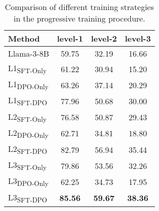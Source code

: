 \begin{table}[t]
    \small
    \centering
    \begin{tabular}{l|ccc}
    \toprule
    \textbf{Method} & \textbf{level-1} & \textbf{level-2} & \textbf{level-3} \\ \midrule
    Llama-3-8B & 59.75 & 32.19 & 16.66 \\ \midrule
    L1\textsubscript{SFT-Only} & 61.22 & 30.94 & 15.20 \\ 
    L1\textsubscript{DPO-Only} & 63.26 & 37.14 & 20.29 \\ 
    L1\textsubscript{SFT-DPO} & 77.96 & 50.68 & 30.00 \\ \midrule
    L2\textsubscript{SFT-Only} & 76.58 & 50.87 & 29.43 \\ 
    L2\textsubscript{DPO-Only} & 62.71 & 34.81 & 18.80 \\ 
    L2\textsubscript{SFT-DPO} & 82.79 & 56.94 & 35.44 \\ \midrule
    L3\textsubscript{SFT-Only} & 79.86 & 53.56 & 32.26 \\ 
    L3\textsubscript{DPO-Only} & 62.25 & 34.73 & 17.95 \\ 
    L3\textsubscript{SFT-DPO} & \textbf{85.56} & \textbf{59.67} & \textbf{38.36} \\ \bottomrule
    \end{tabular}
    \caption{Comparison of different training strategies in the progressive training procedure.}
    \label{tab:ab-progressive}
\end{table}
